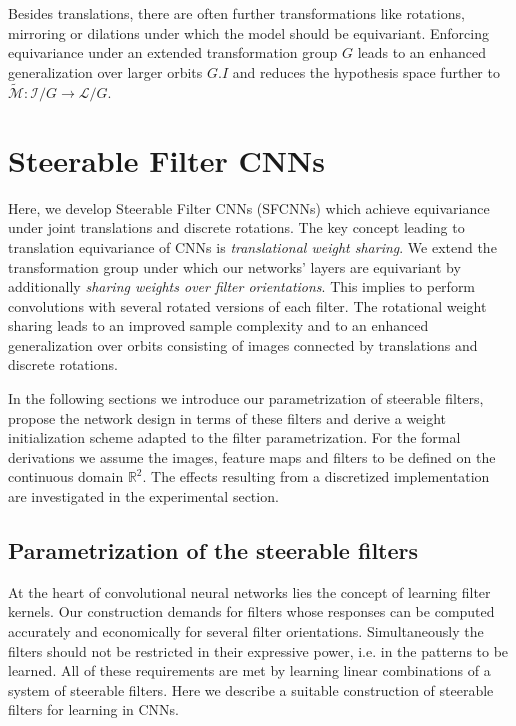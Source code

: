 \documentclass[10pt,twocolumn,letterpaper]{article}
\newcommand{\R}{\mathbb{R}}
\begin{document}
Besides translations, there are often further transformations like rotations, mirroring or dilations under which the model should be equivariant.
Enforcing equivariance under an extended transformation group $G$ leads to an enhanced generalization over larger orbits $G.I$ and reduces the hypothesis space further to $\widetilde{\mathcal{M}}:\mathcal{I}/G\to\mathcal{L}/G.$



\section{Steerable Filter CNNs}

Here, we develop Steerable Filter CNNs (\mbox{SFCNNs}) which achieve equivariance under joint translations and discrete rotations.
The key concept leading to translation equivariance of CNNs is \emph{translational weight sharing}.
We extend the transformation group under which our networks' layers are equivariant by additionally \emph{sharing weights over filter orientations}.
This implies to perform convolutions with several rotated versions of each filter.
The rotational weight sharing leads to an improved sample complexity and to an enhanced generalization over orbits consisting of images connected by translations and discrete rotations.

In the following sections we introduce our parametrization of steerable filters, propose the network design in terms of these filters and derive a weight initialization scheme adapted to the filter parametrization.
For the formal derivations we assume the images, feature maps and filters to be defined on the continuous domain $\R^2$.
The effects resulting from a discretized implementation are investigated in the experimental section.


\subsection{Parametrization of the steerable filters}\label{sec:FilterConstruction}

At the heart of convolutional neural networks lies the concept of learning filter kernels.
Our construction demands for filters whose responses can be computed accurately and economically for several filter orientations.
Simultaneously the filters should not be restricted in their expressive power, i.e. in the patterns to be learned.
All of these requirements are met by learning linear combinations of a system of steerable filters.
Here we describe a suitable construction of steerable filters for learning in CNNs.
\end{document}
